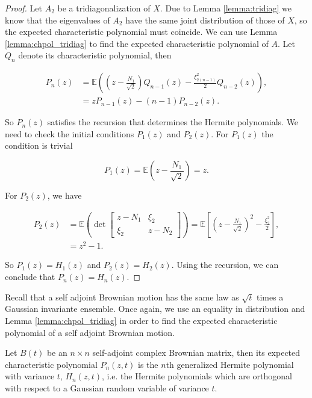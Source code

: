 \begin{proof}
    Let $A_2$ be a tridiagonalization of $X$. Due to Lemma \ref{lemma:tridiag} we know that the eigenvalues of $A_2$ have the same joint distribution of those of $X$, so the expected characteristic polynomial must coincide. We can use Lemma \ref{lemma:chpol_tridiag} to find the expected characteristic polynomial of $A$. Let $Q_n$ denote its characteristic polynomial, then

    \begin{align*}
        P_n(z) &= \mathbb E\left( \left(z - \frac{N_1}{\sqrt2}\right)Q_{n-1}(z) - \frac{\xi_{2(n-1)}^2}{2}Q_{n-2}(z) \right),\\ 
               &= zP_{n-1}(z) - (n-1)P_{n-2}(z).
    \end{align*}

    So $P_n(z)$ satisfies the recursion that determines the Hermite polynomials. We need to check the initial conditions $P_1(z)$ and $P_2(z)$. For $P_1(z)$ the condition is trivial

    \begin{equation*}
        P_1(z) = \mathbb E \left( z - \frac{N_1}{\sqrt{2}} \right) = z.
    \end{equation*}

    For $P_2(z)$, we have

    \begin{align*}
        P_2(z) &= \mathbb E \left( \det \begin{bmatrix}
        z - N_1 & \xi_{2} \\ 
        \xi_2 & z - N_2
        \end{bmatrix} \right) = \mathbb E \left[ \left(z - \frac{N_1}{\sqrt{2}}\right)^2 - \frac{\xi_2^2}2 \right],\\ 
        &= z^2 - 1.
    \end{align*}

    So $P_1(z) = H_1(z)$ and $P_2(z) = H_2(z)$. Using the recursion, we can conclude that $P_n(z) = H_n(z)$.
\end{proof}

Recall that a self adjoint Brownian motion has the same law as $\sqrt{t}$ times a Gaussian invariante ensemble. Once again, we use an equality in distribution and Lemma \ref{lemma:chpol_tridiag} in order to find the expected characteristic polynomial of a self adjoint Brownian motion.

\begin{corollary} \label{corollary:brownian_expected}
    Let $B(t)$ be an $n\times n$ self-adjoint complex Brownian matrix, then its expected characteristic polynomial $P_n(z,t)$ is the $n$th generalized Hermite polynomial with variance $t$, $H_n(z,t)$, i.e. the Hermite polynomials which are orthogonal with respect to a Gaussian random variable of variance $t$.
\end{corollary}

